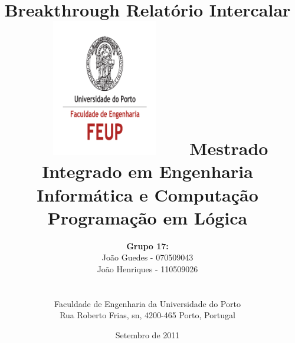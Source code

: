 \documentclass[15pt,a4paper]{article}
\begin{document}
\setlength{\textwidth}{16cm}
\setlength{\textheight}{22cm}



\title{
	\Huge\textbf{Breakthrough}
	\linebreak\linebreak\linebreak
	\Large\textbf{Relatório Intercalar}
	\linebreak\linebreak
	\includegraphics[height=6cm, width=7cm]{feup.pdf}
	\linebreak \linebreak
	\Large{Mestrado Integrado em Engenharia Informática e Computação}
	\linebreak\linebreak
	\Large{Programação em Lógica}\linebreak
}


\author{\textbf{Grupo 17:}
\\ João Guedes - 070509043
\\ João Henriques - 110509026
\\\linebreak\linebreak \\
\\ Faculdade de Engenharia da Universidade do Porto
\\ Rua Roberto Frias, s\/n, 4200-465 Porto, Portugal
\linebreak\linebreak\linebreak
\linebreak\linebreak\vspace{1cm}}
\date{Setembro de 2011}
\maketitle
\thispagestyle{empty}
\end{document}

